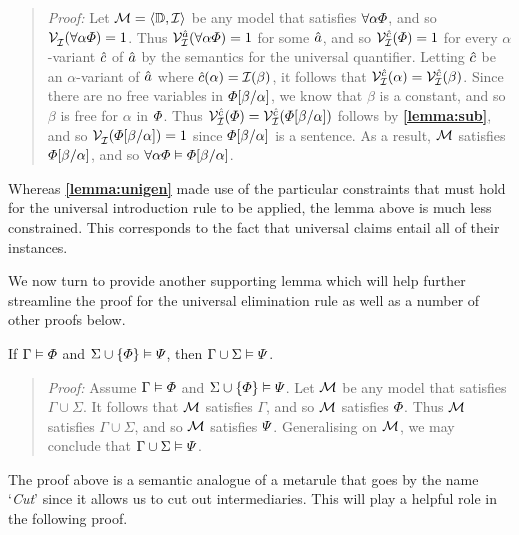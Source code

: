 \begin{quote} 
  \textit{Proof:} Let $\mathcal{M}=\langle\mathbb{D},\mathcal{I}\rangle$ be any model that satisfies $\forall \alpha\varPhi$, and so $\mathcal{V}_{\mathcal{I}}^{}(\forall \alpha\varPhi)=1$.
  Thus $\mathcal{V}_{\mathcal{I}}^{\hat{a}}(\forall \alpha\varPhi)=1$ for some $\hat{a}$, and so $\mathcal{V}_{\mathcal{I}}^{\hat{c}}(\varPhi)=1$ for every $\alpha$-variant $\hat{c}$ of $\hat{a}$ by the semantics for the universal quantifier.
  Letting $\hat{c}$ be an $\alpha$-variant of $\hat{a}$ where $\hat{c}(\alpha)=\mathcal{I}(\beta)$, it follows that $\mathcal{V}_{\mathcal{I}}^{\hat{c}}(\alpha)=\mathcal{V}_{\mathcal{I}}^{\hat{c}}(\beta)$.
  Since there are no free variables in $\varPhi[\beta/\alpha]$, we know that $\beta$ is a constant, and so $\beta$ is free for $\alpha$ in $\varPhi$.
  Thus $\mathcal{V}_{\mathcal{I}}^{\hat{c}}(\varPhi)=\mathcal{V}_{\mathcal{I}}^{\hat{c}}(\varPhi[\beta/\alpha])$ follows by \textbf{\ref{lemma:sub}}, and so $\mathcal{V}_{\mathcal{I}}^{}(\varPhi[\beta/\alpha])=1$ since $\varPhi[\beta/\alpha]$ is a sentence.
  As a result, $\mathcal{M}$ satisfies $\varPhi[\beta/\alpha]$, and so $\forall\alpha\varPhi \vDash \varPhi[\beta/\alpha]$.
\end{quote}

Whereas \textbf{\ref{lemma:unigen}} made use of the particular constraints that must hold for the universal introduction rule to be applied, the lemma above is much less constrained.
This corresponds to the fact that universal claims entail all of their instances.

We now turn to provide another supporting lemma which will help further streamline the proof for the universal elimination rule as well as a number of other proofs below.




\begin{Lthm} \label{lemma:cut}
  If $\Gamma \vDash \varPhi$ and $\Sigma \cup \lbrace\varPhi\rbrace \vDash \varPsi$, then $\Gamma\cup\Sigma \vDash \varPsi$. 
\end{Lthm}

\begin{quote} 
  \textit{Proof:} Assume $\Gamma \vDash \varPhi$ and $\Sigma \cup \lbrace\varPhi\rbrace \vDash \varPsi$.
  Let $\mathcal{M}$ be any model that satisfies $\Gamma\cup\Sigma$.
  It follows that $\mathcal{M}$ satisfies $\Gamma$, and so $\mathcal{M}$ satisfies $\varPhi$.
  Thus $\mathcal{M}$ satisfies $\Gamma\cup\Sigma$, and so $\mathcal{M}$ satisfies $\varPsi$.
  Generalising on $\mathcal{M}$, we may conclude that $\Gamma\cup\Sigma\vDash\varPsi$.
\end{quote}

The proof above is a semantic analogue of a metarule that goes by the name `\textit{Cut}' since it allows us to cut out intermediaries.
This will play a helpful role in the following proof.



